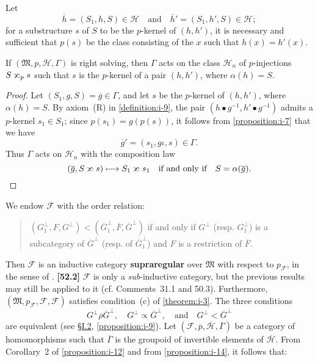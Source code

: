 \documentclass[a4paper,fleqn]{article}
\theoremstyle{plain}
\newenvironment{proposition}[1]
  {\renewcommand\theinnerproposition{#1}\innerproposition}
  {\endinnerproposition}
\theoremstyle{definition}
\newenvironment{longcomm}[1]
  {\noindent\textbf{[#1]}\rmfamily}
  {}
\newcommand{\unsure}[1]{{\color{purple}\textbf{#1}}}
\newcommand{\textand}{\quad\text{and}\quad}
\newcommand{\HH}{\mathcal{H}}
\newcommand{\bHH}{\overline{\HH}}
\newcommand{\MM}{\mathfrak{M}}
\newcommand{\FF}{\mathcal{F}}
\newcommand{\relrhobar}{\mathrel{\overline{\rho}}}
\newcommand{\subs}{\mathrel{\propto}}
\newcommand{\sups}{\mathrel{\reflectbox{$\propto$}}}
\begin{document}
Let
\[
  \overline{h} = (S_1,h,S)\in\HH
  \textand
  \overline{h}' = (S_1,h',S)\in\HH;
\]
for a substructure $s$ of $S$ to be the $p$-kernel of $(h,h')$, it is necessary and sufficient that $p(s)$ be the class consisting of the $x$ such that $h(x)=h'(x)$.

\begin{proposition}{16}
\label{proposition:i-16}
  If $(\MM,p,\HH,\Gamma)$ is right solving, then $\Gamma$ acts on the class $\HH_n$ of $p$-injections $S\sups_p s$ such that $s$ is the $p$-kernel of a pair $(h,h')$, where $\alpha(h)=S$.
\end{proposition}

\begin{proof}
  Let $(S_1,g,S)=\overline{g}\in\Gamma$, and let $s$ be the $p$-kernel of $(h,h')$, where $\alpha(h)=S$.
  By axiom~(R) in \cref{definition:i-9}, the pair $(h\bullet g^{-1},h'\bullet g^{-1})$ admits a $p$-kernel $s_1\in S_1$;
  since $p(s_1)=g(p(s))$, it follows from \cref{proposition:i-7} that we have
  \[
    \overline{g}' = (s_1,g\iota,s)
    \in\Gamma.
  \]
  Thus $\Gamma$ acts on $\HH_n$ with the composition law
  \[
    (\overline{g},S\sups s)
    \longmapsto S_1\sups s_1
    \quad\text{if and only if}\quad
    S=\alpha(\overline{g}).
    \qedhere
  \]
\end{proof}

We endow $\FF$ with the order relation:
\begin{quote}
  $(G_1^\perp,F,G^\perp)<(\overline{G}_1^\perp,\overline{F},\overline{G}^\perp)$
  \qquad if and only if\quad
  $G^\perp$ (resp. $G_1^\perp$) is a subcategory of $\overline{G}^\perp$ (resp. of $\overline{G}_1^\perp$) and $F$ is a restriction of $\overline{F}$.
\end{quote}

Then $\FF$ is an inductive category \unsure{supraregular} over $\MM$ with respect to $p_\FF$, in the sense of \cite{3c}.
\begin{longcomm}{52.2}
  $\FF$ is only a \emph{sub}-inductive category, but the previous results may still be applied to it (cf. Comments~31.1 and 50.3).
\end{longcomm}
Furthermore, $(\MM,p_\FF,\FF,\FF)$ satisfies condition~(c) of \cref{theorem:i-3}.
The three conditions
\[
  G^\perp\relrhobar\overline{G}^\perp,
  \quad G^\perp\subs\overline{G}^\perp,
  \textand G^\perp<\overline{G}^\perp
\]
are equivalent (see \hyperref[section:ii]{§I.2}, \cref{proposition:i-9}).
Let $(\FF,\overline{p},\bHH,\overline{\Gamma})$ be a category of homomorphisms such that $\overline{\Gamma}$ is the groupoid of invertible elements of $\bHH$.
From Corollary~2 of \cref{proposition:i-12} and from \cref{proposition:i-14}, it follows that:
\end{document}
